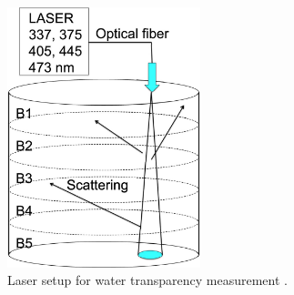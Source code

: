 \begin{figure}
\centering
\includegraphics[width=0.5\textwidth]{figures/Laser.jpg}
\caption{Laser setup for water transparency measurement \cite{Abe:2013gga}.}
\label{fig:laser}
\end{figure}